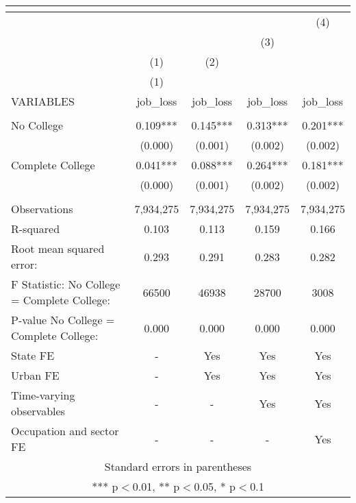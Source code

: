 \begin{tabular}{lcccc}
\multicolumn{5}{c}{} \\ \hline
 &  &  &  & (4) \\
 &  &  & (3) &  \\
 & (1) & (2) &  &  \\
 & (1) &  &  &  \\
VARIABLES & job\_loss & job\_loss & job\_loss & job\_loss \\ \hline
 &  &  &  &  \\
No College & 0.109*** & 0.145*** & 0.313*** & 0.201*** \\
 & (0.000) & (0.001) & (0.002) & (0.002) \\
Complete College & 0.041*** & 0.088*** & 0.264*** & 0.181*** \\
 & (0.000) & (0.001) & (0.002) & (0.002) \\
 &  &  &  &  \\
Observations & 7,934,275 & 7,934,275 & 7,934,275 & 7,934,275 \\
R-squared & 0.103 & 0.113 & 0.159 & 0.166 \\
Root mean squared error: & 0.293 & 0.291 & 0.283 & 0.282 \\
F Statistic: No College = Complete College: & 66500 & 46938 & 28700 & 3008 \\
\hspace{1mm} P-value No College = Complete College: & 0.000 & 0.000 & 0.000 & 0.000 \\
State FE & - & Yes & Yes & Yes \\
Urban FE & - & Yes & Yes & Yes \\
Time-varying observables & - & - & Yes & Yes \\
 Occupation and sector FE & - & - & - & Yes \\ \hline
\multicolumn{5}{c}{ Standard errors in parentheses} \\
\multicolumn{5}{c}{ *** p$<$0.01, ** p$<$0.05, * p$<$0.1} \\
\end{tabular}
